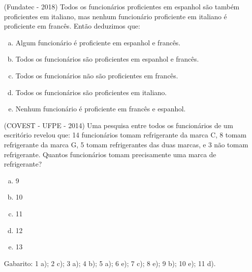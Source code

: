 \begin{exer}
(Fundatec - 2018) Todos os funcionários proficientes em espanhol são também proficientes em italiano, mas nenhum funcionário proficiente em italiano é proficiente em francês. Então deduzimos que:
\begin{enumerate}[a)]
\item Algum funcionário é proficiente em espanhol e francês.
\item Todos os funcionários são proficientes em espanhol e francês.
\item Todos os funcionários não são proficientes em francês.
\item Todos os funcionários são proficientes em italiano.
\item Nenhum funcionário é proficiente em francês e espanhol.
\end{enumerate}
\end{exer}

\begin{exer}
(COVEST - UFPE - 2014)  Uma pesquisa entre todos os funcionários de um escritório revelou que: 14 funcionários tomam refrigerante da marca C, 8 tomam refrigerante da marca G, 5 tomam refrigerantes das duas marcas, e 3 não tomam refrigerante. Quantos funcionários tomam precisamente uma marca de refrigerante?
\begin{enumerate}[a)]
\item 9
\item 10
\item 11
\item 12
\item 13
\end{enumerate}
\end{exer}

 Gabarito:
 1 a); 2 c); 3 a); 4 b); 5 a); 6 e); 7 c); 8 e); 9 b); 10 e); 11 d).

